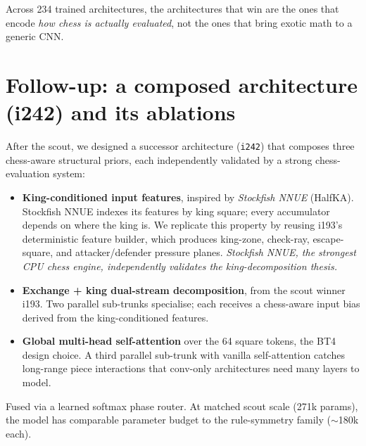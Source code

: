 \documentclass[10pt,a4paper]{article}
\begin{document}
\begin{tcolorbox}[callout, title=Single-sentence takeaway]
Across 234 trained architectures, the architectures that win are the
ones that encode \emph{how chess is actually evaluated}, not the ones that
bring exotic math to a generic CNN.
\end{tcolorbox}

\clearpage
\section{Follow-up: a composed architecture (i242) and its ablations}

After the scout, we designed a successor architecture (\texttt{i242}) that
composes three chess-aware structural priors, each independently validated
by a strong chess-evaluation system:

\begin{itemize}
\item \textbf{King-conditioned input features}, inspired by
\textit{Stockfish NNUE} (HalfKA). Stockfish NNUE indexes its features by
king square; every accumulator depends on where the king is. We replicate
this property by reusing i193's deterministic feature builder, which
produces king-zone, check-ray, escape-square, and attacker/defender
pressure planes. \textit{Stockfish NNUE, the strongest CPU chess engine,
independently validates the king-decomposition thesis.}
\item \textbf{Exchange + king dual-stream decomposition}, from the scout
winner i193. Two parallel sub-trunks specialise; each receives a chess-aware
input bias derived from the king-conditioned features.
\item \textbf{Global multi-head self-attention} over the 64 square tokens,
the BT4 design choice. A third parallel sub-trunk with vanilla self-attention
catches long-range piece interactions that conv-only architectures need
many layers to model.
\end{itemize}

Fused via a learned softmax phase router. At matched scout scale
(271k params), the model has comparable parameter budget to the rule-symmetry
family ($\sim$180k each).
\end{document}
